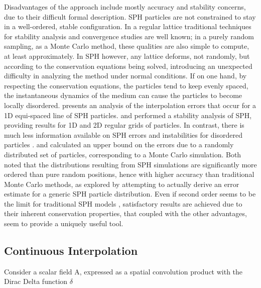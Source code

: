 Disadvantages of the approach include mostly accuracy and stability concerns, due to their difficult formal description. \ac{SPH} particles are not constrained to stay in a well-ordered, stable configuration. In a regular lattice traditional techniques for stability analysis and convergence studies are well known; in a purely random sampling, as a Monte Carlo method, these qualities are also simple to compute, at least approximately. In \ac{SPH} however, any lattice deforms, not randomly, but according to the conservation equations being solved, introducing an unexpected difficulty in analyzing the method under normal conditions. If on one hand, by respecting the conservation equations, the particles tend to keep evenly spaced, the instantaneous dynamics of the medium can cause the particles to become locally disordered.  \cite{Monaghan-2005} presents an analysis of the interpolation errors that occur for a 1D equi-spaced line of \ac{SPH} particles. \cite{Swegle-1995} and \cite{Morris-1997} performed a stability analysis of \ac{SPH}, providing results for 1D and 2D regular grids of particles. In contrast, there is much less information available on \ac{SPH} errors and instabilities for disordered particles \citep{Ellero-2011}. \cite{Monaghan-2005} and \cite{Dehnen-2012} calculated an upper bound on the errors due to a randomly distributed set of particles, corresponding to a Monte Carlo simulation. Both noted that the distributions resulting from \ac{SPH} simulations are significantly more ordered than pure random positions, hence with higher accuracy than traditional Monte Carlo methods, as \cite{Quinlan-al-2006} explored by attempting to actually derive an error estimate for a generic SPH particle distribution. Even if second order seems to be the limit for traditional \ac{SPH} models \citep{Monaghan-2005, Oger-al-2007}, satisfactory results are achieved due to their inherent conservation properties, that coupled with the other advantages, seem to provide a uniquely useful tool.

\subsection{Continuous Interpolation}
\label{Subsec:Interpolation}

Consider a scalar field A, expressed as a spatial convolution product with the Dirac Delta function $\delta$

